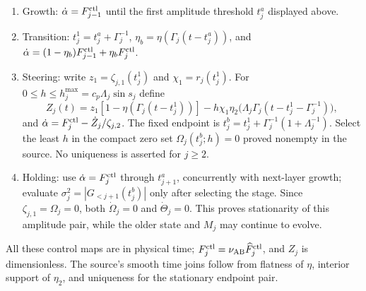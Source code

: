 \begin{enumerate}
\item Growth: $\dot\alpha=F_{j-1}^{\rm ctl}$ until the first amplitude threshold $t_j^a$ displayed above.
\item Transition: $t_j^1=t_j^a+\Gamma_j^{-1}$, $\eta_b=\eta(\Gamma_j(t-t_j^a))$, and $\dot\alpha=(1-\eta_b)F_{j-1}^{\rm ctl}+\eta_b F_j^{\rm ctl}$.
\item Steering: write $z_1=\zeta_{j,1}(t_j^1)$ and $\chi_1=r_j(t_j^1)$. For $0\le h\le h_j^{\max}=c_p\Lambda_j\sin s_j$ define
\[
 Z_j(t)=z_1[1-\eta(\Gamma_j(t-t_j^1))]
 -h\chi_1\eta_2\bigl(\Lambda_j\Gamma_j(t-t_j^1-\Gamma_j^{-1})\bigr),
\]
and $\dot\alpha=F_j^{\rm ctl}-\dot Z_j/\zeta_{j,2}$. The fixed endpoint is $t_j^b=t_j^1+\Gamma_j^{-1}(1+\Lambda_j^{-1})$. Select the least $h$ in the compact zero set $\Omega_j(t_j^b;h)=0$ proved nonempty in the source. No uniqueness is asserted for $j\ge2$.
\item Holding: use $\dot\alpha=F_j^{\rm ctl}$ through $t_{j+1}^a$, concurrently with next-layer growth; evaluate $\sigma_j^2=|G_{<j+1}(t_j^b)|$ only after selecting the stage. Since $\zeta_{j,1}=\Omega_j=0$, both $\dot\Omega_j=0$ and $\dot\Theta_j=0$. This proves stationarity of this amplitude pair, while the older state and $M_j$ may continue to evolve.
\end{enumerate}
All these control maps are in physical time; $F_j^{\rm ctl}=\nu_{\mathrm{AB}}\widehat F_j^{\rm ctl}$, and $Z_j$ is dimensionless. The source's smooth time joins follow from flatness of $\eta$, interior support of $\eta_2$, and uniqueness for the stationary endpoint pair.

